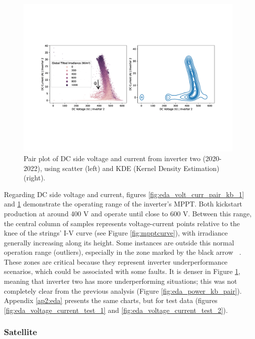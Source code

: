 \begin{figure}[h!]
    \centering
    \includegraphics[width=\textwidth,trim={0 5.5cm 0cm 5.5cm},clip]{figures/chapter5/analysis/06_voltage_current_pairplot_kb_2_annotated-1.png}
    \caption{Pair plot of DC side voltage and current from inverter two (2020-2022), using scatter (left) and KDE (Kernel Density Estimation) (right).}
    \label{fig:eda_volt_curr_pair_kb_2}
\end{figure}

Regarding DC side voltage and current, figures \ref{fig:eda_volt_curr_pair_kb_1} and \ref{fig:eda_volt_curr_pair_kb_2} demonstrate the operating range of the inverter's MPPT. Both kickstart production at around 400 V and operate until close to 600 V. Between this range, the central column of samples represents voltage-current points relative to the knee of the strings' I-V curve (see Figure \ref{fig:mpptcurve}), with irradiance generally increasing along its height. Some instances are outside this normal operation range (outliers), especially in the zone marked by the black arrow \textcircled{}\textcircled{}. These zones are critical because they represent inverter underperformance scenarios, which could be associated with some faults. It is denser in Figure \ref{fig:eda_volt_curr_pair_kb_2}, meaning that inverter two has more underperforming situations; this was not completely clear from the previous analysis (Figure \ref{fig:eda_power_kb_pair}). Appendix \ref{ap2:eda} presents the same charts, but for test data (figures \ref{fig:eda_voltage_current_test_1} and \ref{fig:eda_voltage_current_test_2}).

\subsubsection{Satellite} \label{subsubsec:eda_sat}

